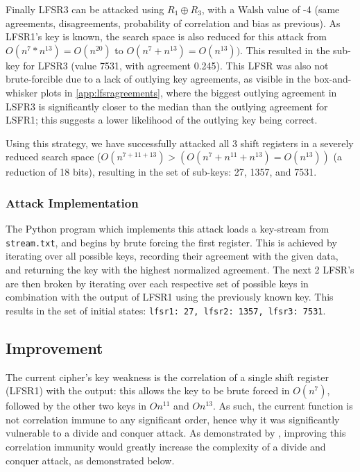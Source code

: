 \documentclass[british,11pt,a4paper]{article}
\begin{document}
Finally LFSR3 can be attacked using \(R_1 \oplus R_3\), with a Walsh value of -4 (same agreements, disagreements, probability of correlation and bias as previous).
As LFSR1's key is known, the search space is also reduced for this attack from \(O(n^{7} * n^{13})=O(n^{20})\) to \(O(n^7 + n^{13})=O(n^{13}))\). This resulted in the sub-key for LFSR3 (value 7531, with agreement 0.245). This LFSR was also not brute-forcible due to a lack of outlying key agreements, as visible in the box-and-whisker plots in \autoref{app:lfsragreements}, where the biggest outlying agreement in LSFR3 is significantly closer to the median than the outlying agreement for LSFR1; this suggests a lower likelihood of the outlying key being correct.

Using this strategy, we have successfully attacked all 3 shift registers in a severely reduced search space (\(O(n^{7+11+13})>(O(n^{7}+n^{11}+n^{13})=O(n^{13}))\) (a reduction of 18 bits), resulting in the set of sub-keys: 27, 1357, and 7531.

\subsubsection{Attack Implementation}
The Python program which implements this attack loads a key-stream from \lstinline{stream.txt}, and begins by brute forcing the first register.
This is achieved by iterating over all possible keys, recording their agreement with the given data, and returning the key with the highest normalized agreement.
The next 2 LFSR's are then broken by iterating over each respective set of possible keys in combination with the output of LFSR1 using the previously known key.
This results in the set of initial states: \lstinline{lfsr1: 27, lfsr2: 1357, lfsr3: 7531}.

\subsection{Improvement}
The current cipher's key weakness is the correlation of a single shift register (LFSR1) with the output: this allows the key to be brute forced in \(O(n^7)\), followed by the other two keys in \(On^{11}\) and \(On^{13}\).
As such, the current function is not correlation immune to any significant order, hence why it was significantly vulnerable to a divide and conquer attack. As demonstrated by \citet{siegenthaler}, improving this correlation immunity would greatly increase the complexity of a divide and conquer attack, as demonstrated below.
\end{document}
